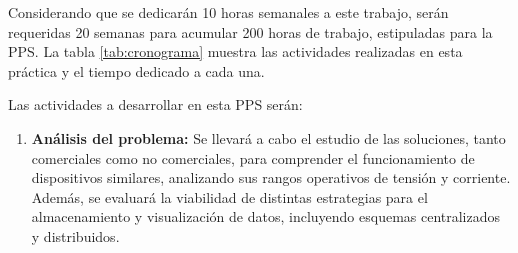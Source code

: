 \documentclass[12pt, a4paper]{article} %
\begin{document}
Considerando que se dedicarán 10 horas semanales a este trabajo, serán requeridas 20 semanas para acumular 200 horas de trabajo, estipuladas para la PPS. La tabla \ref{tab:cronograma} muestra las actividades realizadas en esta práctica y el tiempo dedicado a cada una.

Las actividades a desarrollar en esta PPS serán:
\begin{enumerate}
  \item \textbf{Análisis del problema:} Se llevará a cabo el estudio de las soluciones, tanto comerciales como no comerciales, para comprender el funcionamiento de dispositivos similares, analizando sus rangos operativos de tensión y corriente. Además, se evaluará la viabilidad de distintas estrategias para el almacenamiento y visualización de datos, incluyendo esquemas centralizados y distribuidos.


\end{enumerate}
\end{document}
